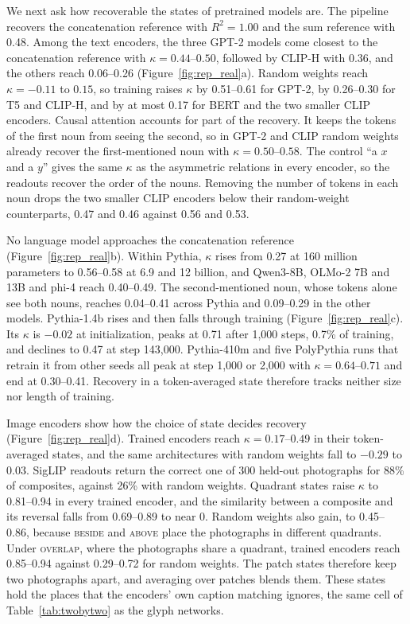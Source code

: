 \documentclass[10pt]{article}
\theoremstyle{plain}
\theoremstyle{remark}
\begin{document}
We next ask how recoverable the states of pretrained models are. The pipeline recovers the concatenation reference with $R^2 = 1.00$ and the sum reference with 0.48. Among the text encoders, the three GPT-2 models come closest to the concatenation reference with $\kappa = 0.44$--$0.50$, followed by CLIP-H with 0.36, and the others reach 0.06--0.26 (Figure~\ref{fig:rep_real}a). Random weights reach $\kappa = -0.11$ to $0.15$, so training raises $\kappa$ by 0.51--0.61 for GPT-2, by 0.26--0.30 for T5 and CLIP-H, and by at most 0.17 for BERT and the two smaller CLIP encoders. Causal attention accounts for part of the recovery. It keeps the tokens of the first noun from seeing the second, so in GPT-2 and CLIP random weights already recover the first-mentioned noun with $\kappa = 0.50$--$0.58$. The control ``a $x$ and a $y$'' gives the same $\kappa$ as the asymmetric relations in every encoder, so the readouts recover the order of the nouns. Removing the number of tokens in each noun drops the two smaller CLIP encoders below their random-weight counterparts, 0.47 and 0.46 against 0.56 and 0.53.

\label{sec:llm}No language model approaches the concatenation reference (Figure~\ref{fig:rep_real}b). Within Pythia, $\kappa$ rises from 0.27 at 160 million parameters to 0.56--0.58 at 6.9 and 12 billion, and Qwen3-8B, OLMo-2 7B and 13B and phi-4 reach 0.40--0.49. The second-mentioned noun, whose tokens alone see both nouns, reaches 0.04--0.41 across Pythia and 0.09--0.29 in the other models. Pythia-1.4b rises and then falls through training (Figure~\ref{fig:rep_real}c). Its $\kappa$ is $-0.02$ at initialization, peaks at 0.71 after 1{,}000 steps, 0.7\% of training, and declines to 0.47 at step 143{,}000. Pythia-410m and five PolyPythia runs that retrain it from other seeds all peak at step 1{,}000 or 2{,}000 with $\kappa = 0.64$--$0.71$ and end at 0.30--0.41. Recovery in a token-averaged state therefore tracks neither size nor length of training.

\label{sec:vision}Image encoders show how the choice of state decides recovery (Figure~\ref{fig:rep_real}d). Trained encoders reach $\kappa = 0.17$--$0.49$ in their token-averaged states, and the same architectures with random weights fall to $-0.29$ to $0.03$. SigLIP readouts return the correct one of 300 held-out photographs for 88\% of composites, against 26\% with random weights. Quadrant states raise $\kappa$ to 0.81--0.94 in every trained encoder, and the similarity between a composite and its reversal falls from 0.69--0.89 to near 0. Random weights also gain, to 0.45--0.86, because \textsc{beside} and \textsc{above} place the photographs in different quadrants. Under \textsc{overlap}, where the photographs share a quadrant, trained encoders reach 0.85--0.94 against 0.29--0.72 for random weights. The patch states therefore keep two photographs apart, and averaging over patches blends them. These states hold the places that the encoders' own caption matching ignores, the same cell of Table~\ref{tab:twobytwo} as the glyph networks.
\end{document}
